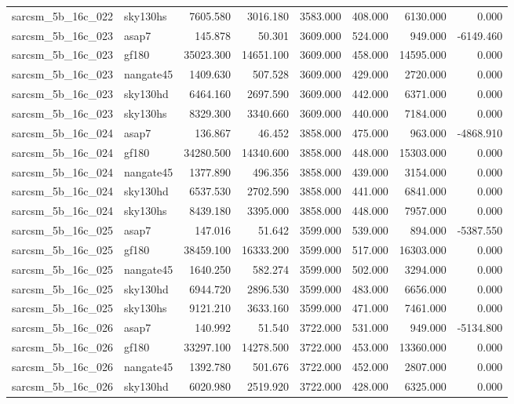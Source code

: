 \begin{tabular}{llrrrrrr}
sarcsm\_5b\_16c\_022 & sky130hs & 7605.580 & 3016.180 & 3583.000 & 408.000 & 6130.000 & 0.000 \\
sarcsm\_5b\_16c\_023 & asap7 & 145.878 & 50.301 & 3609.000 & 524.000 & 949.000 & -6149.460 \\
sarcsm\_5b\_16c\_023 & gf180 & 35023.300 & 14651.100 & 3609.000 & 458.000 & 14595.000 & 0.000 \\
sarcsm\_5b\_16c\_023 & nangate45 & 1409.630 & 507.528 & 3609.000 & 429.000 & 2720.000 & 0.000 \\
sarcsm\_5b\_16c\_023 & sky130hd & 6464.160 & 2697.590 & 3609.000 & 442.000 & 6371.000 & 0.000 \\
sarcsm\_5b\_16c\_023 & sky130hs & 8329.300 & 3340.660 & 3609.000 & 440.000 & 7184.000 & 0.000 \\
sarcsm\_5b\_16c\_024 & asap7 & 136.867 & 46.452 & 3858.000 & 475.000 & 963.000 & -4868.910 \\
sarcsm\_5b\_16c\_024 & gf180 & 34280.500 & 14340.600 & 3858.000 & 448.000 & 15303.000 & 0.000 \\
sarcsm\_5b\_16c\_024 & nangate45 & 1377.890 & 496.356 & 3858.000 & 439.000 & 3154.000 & 0.000 \\
sarcsm\_5b\_16c\_024 & sky130hd & 6537.530 & 2702.590 & 3858.000 & 441.000 & 6841.000 & 0.000 \\
sarcsm\_5b\_16c\_024 & sky130hs & 8439.180 & 3395.000 & 3858.000 & 448.000 & 7957.000 & 0.000 \\
sarcsm\_5b\_16c\_025 & asap7 & 147.016 & 51.642 & 3599.000 & 539.000 & 894.000 & -5387.550 \\
sarcsm\_5b\_16c\_025 & gf180 & 38459.100 & 16333.200 & 3599.000 & 517.000 & 16303.000 & 0.000 \\
sarcsm\_5b\_16c\_025 & nangate45 & 1640.250 & 582.274 & 3599.000 & 502.000 & 3294.000 & 0.000 \\
sarcsm\_5b\_16c\_025 & sky130hd & 6944.720 & 2896.530 & 3599.000 & 483.000 & 6656.000 & 0.000 \\
sarcsm\_5b\_16c\_025 & sky130hs & 9121.210 & 3633.160 & 3599.000 & 471.000 & 7461.000 & 0.000 \\
sarcsm\_5b\_16c\_026 & asap7 & 140.992 & 51.540 & 3722.000 & 531.000 & 949.000 & -5134.800 \\
sarcsm\_5b\_16c\_026 & gf180 & 33297.100 & 14278.500 & 3722.000 & 453.000 & 13360.000 & 0.000 \\
sarcsm\_5b\_16c\_026 & nangate45 & 1392.780 & 501.676 & 3722.000 & 452.000 & 2807.000 & 0.000 \\
sarcsm\_5b\_16c\_026 & sky130hd & 6020.980 & 2519.920 & 3722.000 & 428.000 & 6325.000 & 0.000 \\

\end{tabular}
